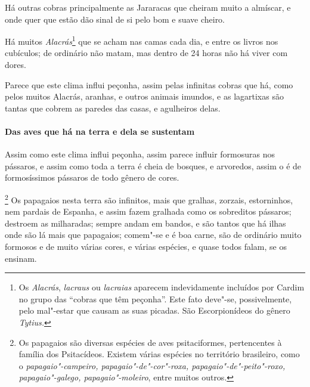 \begin{linenumbers}
 Há outras cobras principalmente as Jararacas que cheiram muito a
almíscar, e onde quer que estão dão sinal de si pelo bom e suave cheiro.

 Há muitos \textit{Alacrás}\footnote{ Os \textit{Alacrás},
\textit{lacraus} ou \textit{lacraias} aparecem indevidamente incluídos por Cardim no grupo
das ``cobras que têm peçonha''. Este fato deve"-se, possivelmente, pelo
mal"-estar que causam as suas picadas. São Escorpionídeos do gênero
\textit{Tytius.}} que se acham nas camas cada dia, e entre os livros
nos cubículos; de ordinário não matam, mas dentro de 24 horas não há
viver com dores.

 Parece que este clima influi peçonha, assim pelas infinitas cobras que
há, como pelos muitos Alacrás, aranhas, e outros animais imundos, e as
lagartixas são tantas que cobrem as paredes das casas, e agulheiros
delas.

\paragraph{Das aves que há na terra e dela se sustentam}\quad
Assim como este clima influi peçonha, assim parece influir
formosuras nos pássaros, e assim como toda a terra é cheia de bosques,
e arvoredos, assim o é de formosíssimos pássaros de todo gênero de
cores.

\footnote{ Os papagaios são diversas espécies de
aves psitaciformes, pertencentes à família dos Psitacídeos. Existem
várias espécies no território brasileiro, como o
\textit{papagaio"-campeiro, papagaio"-de"-cor"-roxa,
papagaio"-de"-peito"-roxo, papagaio"-galego, papagaio"-moleiro}, entre
muitos outros.} Os papagaios nesta terra são infinitos, mais
que gralhas, zorzais, estorninhos, nem pardais de Espanha, e assim
fazem gralhada como os sobreditos pássaros; destroem as milharadas;
sempre andam em bandos, e são tantos que há ilhas onde são lá mais que
papagaios; comem"-se e é boa carne, são de ordinário muito formosos e de
muito várias cores, e várias espécies, e quase todos falam, se os
ensinam.


\end{linenumbers}
